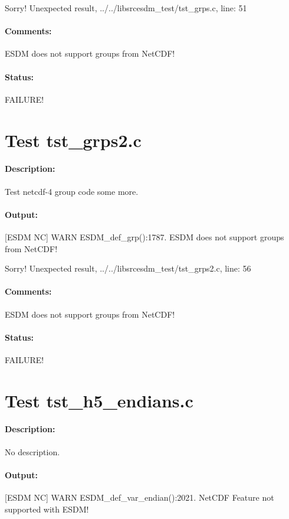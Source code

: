 Sorry! Unexpected result, ../../libsrcesdm\_test/tst\_grps.c, line: 51

\paragraph{Comments:} ESDM does not support groups from NetCDF!

\paragraph{Status:} FAILURE!

\section{Test tst\_grps2.c}

\paragraph{Description:} Test netcdf-4 group code some more.

\paragraph{Output:} [ESDM NC] WARN ESDM\_def\_grp():1787. ESDM does not support groups from NetCDF!

Sorry! Unexpected result, ../../libsrcesdm\_test/tst\_grps2.c, line: 56

\paragraph{Comments:} ESDM does not support groups from NetCDF!

\paragraph{Status:} FAILURE!

\section{Test tst\_h5\_endians.c}

\paragraph{Description:} No description.

\paragraph{Output:} [ESDM NC] WARN ESDM\_def\_var\_endian():2021. NetCDF Feature not supported with ESDM!


